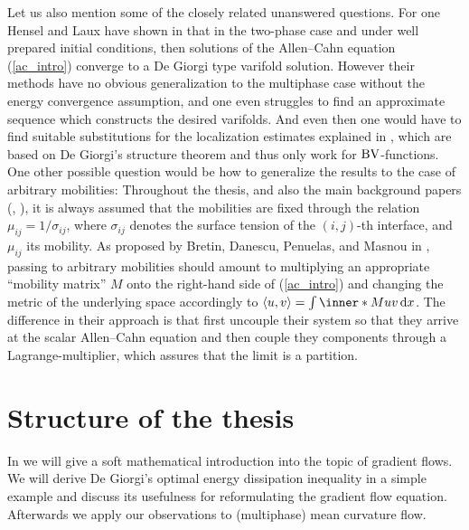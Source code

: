 Let us also mention some of the closely related unanswered questions. For one 
Hensel and Laux have shown in 
\cite{hensel_laux_varifold_solution_concept_for_mean_curvature_flow}
that in the two-phase case and under well prepared initial conditions, then 
solutions of the Allen--Cahn equation (\ref{ac_intro}) converge to a De Giorgi 
type varifold solution. However their methods have no obvious generalization to 
the multiphase case without the energy convergence assumption, and one even 
struggles to find an approximate sequence 
which constructs the desired varifolds. And even then one would have to find 
suitable substitutions for the localization estimates explained in 
, which are based on De Giorgi's structure 
theorem and thus only work for $ \operatorname{BV} $-functions.
One other possible question would be how to generalize the results to the case 
of 
arbitrary mobilities: Throughout the thesis, and also the main background 
papers 
(\cite{convergence_of_allen_cahn_equation_to_multiphase_mean_curvature_flow},
\cite{hensel_laux_varifold_solution_concept_for_mean_curvature_flow}), it is 
always assumed that the mobilities are fixed through the relation $ \mu_{ i j } 
= 1/ \sigma_{ i j } $, where $ \sigma_{ i j } $ denotes the surface tension of 
the $ ( i , j ) $-th interface, and $ \mu_{ i j } $ its mobility. As proposed by
Bretin, Danescu, Penuelas, and Masnou in 
\cite{bretin_dansecu_penuelas_masnou_a_metric_based_approach_to_mmcf_with_mobilities},
passing
to arbitrary mobilities should 
amount to multiplying an appropriate \enquote{mobility matrix} $ M $ onto the 
right-hand side of (\ref{ac_intro}) and changing the metric of the underlying 
space accordingly to $ \langle u , v \rangle = \int \inner*{M u}{ v} \dd{ x } $.
The difference in their approach is that first uncouple their system so that 
they arrive at the scalar Allen--Cahn equation and then couple they components 
through a Lagrange-multiplier, which assures that the limit is a partition.

\section{Structure of the thesis}

In  we will give a soft mathematical 
introduction into the topic of gradient flows. We will derive De Giorgi's 
optimal energy dissipation inequality in a simple example and discuss its 
usefulness for 
reformulating the gradient flow equation. Afterwards we apply our observations 
to (multiphase) mean curvature flow.


